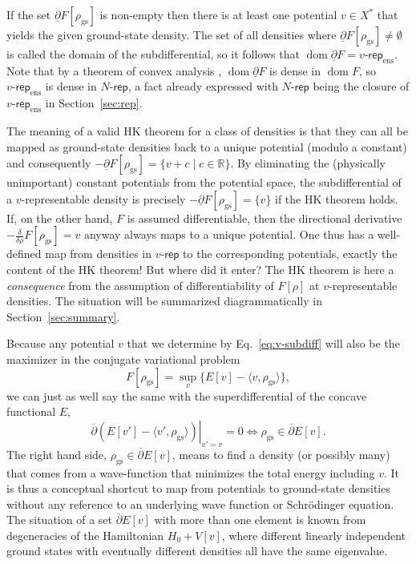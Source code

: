 \documentclass[journal=apcach,manuscript=article,layout=twocolumn]{achemso}
\newcommand{\R}{\mathbb{R}}
\newcommand{\rhogs}{{\rho_\mathrm{gs}}}
\newcommand{\vrep}{\ensuremath{v\text{-}\mathsf{rep}}}
\newcommand{\vrepens}{\ensuremath{\vrep_\mathrm{ens}}}
\newcommand{\Nrep}{\ensuremath{N\text{-}\mathsf{rep}}}
\DeclareMathOperator{\dom}{dom}
\newcommand{\der}{\frac{\delta}{\delta \rho}}
\begin{document}
If the set $\underline\partial F[\rhogs]$ is non-empty then there is at least one potential $v\in X^*$ that yields the given ground-state density. The set of all densities where $\underline\partial F[\rhogs] \neq \emptyset$ is called the domain of the subdifferential, so it follows that $\dom \underline\partial F= \vrepens$. Note that by a theorem of convex analysis \cite[Corollary~2.44]{Barbu-Precupanu}, $\dom \underline\partial F$ is dense in $\dom F$, so $\vrepens$ is dense in $\Nrep$, a fact already expressed with $\Nrep$ being the closure of $\vrepens$ in Section~\ref{sec:rep}.

The meaning of a valid HK theorem for a class of densities is that they can all be mapped as ground-state densities back to a unique potential (modulo a constant) and consequently $-\underline\partial F[\rhogs] = \{v+c \mid c\in\R\}$. By eliminating the (physically unimportant) constant potentials from the potential space, the subdifferential of a $v$-representable density is precisely $-\underline\partial F[\rhogs] = \{v\}$ if the HK theorem holds. If, on the other hand, $F$ is assumed differentiable, then the directional derivative 
$-\der F[\rhogs] = v$ anyway always maps to a unique potential. One thus has a well-defined map from densities in $\vrep$ to the corresponding potentials, exactly the content of the HK theorem! But where did it enter? The HK theorem is here a \emph{consequence} from the assumption of differentiability of $F[\rho]$ at $v$-representable densities. The situation will be summarized diagrammatically in Section~\ref{sec:summary}.

Because any potential $v$ that we determine by Eq.~\eqref{eq:v-subdiff} will also be the maximizer in the conjugate variational problem
\begin{equation*}
    F[\rhogs] = \sup_v \{E[v]-\langle v,\rhogs \rangle\},
\end{equation*}
we can just as well say the same with the superdifferential of the concave functional $E$,
\begin{equation}\label{eq:E-superdiff}
    \left.\overline\partial(E[v'] - \langle v',\rhogs \rangle)\right|_{v'=v}=0 \Longleftrightarrow \rhogs \in \overline\partial E[v].
\end{equation}
The right hand side, $\rhogs \in \overline\partial E[v]$, means to find a density (or possibly many) that comes from a wave-function that minimizes the total energy including $v$. It is thus a conceptual shortcut to map from potentials to ground-state densities without any reference to an underlying wave function or Schr\"odinger equation.
The situation of a set $\overline\partial E[v]$ with more than one element is known from degeneracies of the Hamiltonian $H_0 + V[v]$, where different linearly independent ground states with eventually different densities all have the same eigenvalue.
\end{document}
